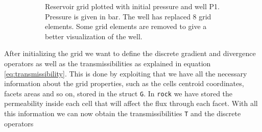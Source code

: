 \begin{figure}[htbp]
\begin{subfigure}[t]{0.48\textwidth}
        \caption{Reservoir grid plotted with initial pressure and well P1. Pressure is given in bar. The well has replaced 8 grid elements. Some grid elements are removed to give a better visualization of the well.}
        \label{fig:flowSolverGridWithWell}
    \end{subfigure}
    \caption{}
\end{figure}

After initializing the grid we want to define the discrete gradient and divergence operators as well as the transmissibilities as explained in equation \eqref{eq:transmissibility}. This is done by exploiting that we have all the necessary information about the grid properties, such as the cells centroid coordinates, facets areas and so on, stored in the struct \texttt{G}. In \texttt{rock} we have stored the permeability inside each cell that will affect the flux through each facet. With all this information we can now obtain the transmissibilities \texttt{T} and the discrete operators



